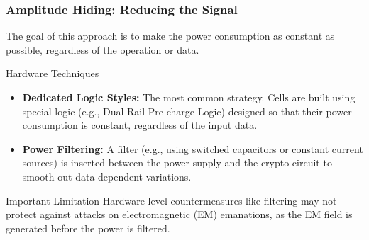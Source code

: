 \begin{frame}
    \frametitle{Amplitude Hiding: Reducing the Signal}

    The goal of this approach is to make the power consumption as constant as possible, regardless of the operation or data.

    \begin{block}{Hardware Techniques}
        \begin{itemize}
            \item \textbf{Dedicated Logic Styles:} The most common strategy. Cells are built using special logic (e.g., Dual-Rail Pre-charge Logic) designed so that their power consumption is constant, regardless of the input data.
            
            \item \textbf{Power Filtering:} A filter (e.g., using switched capacitors or constant current sources) is inserted between the power supply and the crypto circuit to smooth out data-dependent variations.
        \end{itemize}
    \end{block}
    
    \begin{alertblock}{Important Limitation}
        Hardware-level countermeasures like filtering may not protect against attacks on electromagnetic (EM) emanations, as the EM field is generated before the power is filtered.
    \end{alertblock}

\end{frame}

